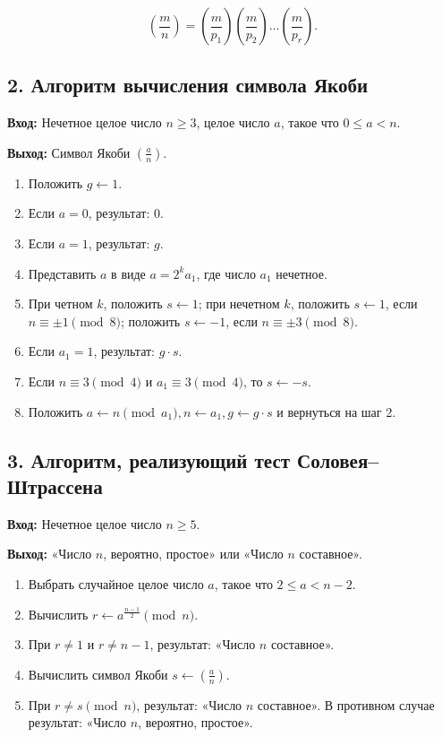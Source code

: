 \documentclass{article}
\begin{document}
\[
\left( \frac{m}{n} \right) = \left( \frac{m}{p_1} \right) \left( \frac{m}{p_2} \right) \ldots \left( \frac{m}{p_r} \right).
\]

\subsection*{2. Алгоритм вычисления символа Якоби}

\textbf{Вход:} Нечетное целое число \( n \geq 3 \), целое число \( a \), такое что \( 0 \leq a < n \).

\textbf{Выход:} Символ Якоби \( \left( \frac{a}{n} \right) \).

\begin{enumerate}
    \item Положить \( g \gets 1 \).
    \item Если \( a = 0 \), результат: 0.
    \item Если \( a = 1 \), результат: \( g \).
    \item Представить \( a \) в виде \( a = 2^k a_1 \), где число \( a_1 \) нечетное.
    \item При четном \( k \), положить \( s \gets 1 \); при нечетном \( k \), положить \( s \gets 1 \), если \( n \equiv \pm1 \pmod{8} \); положить \( s \gets -1 \), если \( n \equiv \pm3 \pmod{8} \).
    \item Если \( a_1 = 1 \), результат: \( g \cdot s \).
    \item Если \( n \equiv 3 \pmod{4} \) и \( a_1 \equiv 3 \pmod{4} \), то \( s \gets -s \).
    \item Положить \( a \gets n \pmod{a_1}, n \gets a_1, g \gets g \cdot s \) и вернуться на шаг 2.
\end{enumerate}

\subsection*{3. Алгоритм, реализующий тест Соловея–Штрассена}

\textbf{Вход:} Нечетное целое число \( n \geq 5 \).

\textbf{Выход:} «Число \( n \), вероятно, простое» или «Число \( n \) составное».

\begin{enumerate}
    \item Выбрать случайное целое число \( a \), такое что \( 2 \leq a < n - 2 \).
    \item Вычислить \( r \gets a^{\frac{n-1}{2}} \pmod{n} \).
    \item При \( r \neq 1 \) и \( r \neq n - 1 \), результат: «Число \( n \) составное».
    \item Вычислить символ Якоби \( s \gets \left( \frac{a}{n} \right) \).
    \item При \( r \neq s \pmod{n} \), результат: «Число \( n \) составное». В противном случае результат: «Число \( n \), вероятно, простое».
\end{enumerate}
\end{document}
